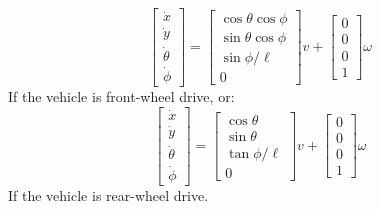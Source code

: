 \begin{equation}
\left[ 
\begin{matrix}
\dot{x} \\ 	\dot{y} \\ 	\dot{\theta} \\	\dot{\phi} 
\end{matrix}
\right] = \left[
\begin{matrix}
\cos\theta\cos\phi \\ \sin\theta\cos\phi \\ \sin\phi/\ell \\ 0 
\end{matrix}
\right] v+ \left[
\begin{matrix}
0 \\0 \\0 \\1
\end{matrix}
\right] \omega
\end{equation}
If the vehicle is front-wheel drive, or:
\begin{equation}
\left[ 
\begin{matrix}
\dot{x} \\ 	\dot{y} \\ 	\dot{\theta} \\	\dot{\phi} 
\end{matrix}
\right] = \left[
\begin{matrix}
\cos\theta \\ \sin\theta \\ \tan\phi/\ell \\ 0 
\end{matrix}
\right] v+ \left[
\begin{matrix}
0 \\0 \\0 \\1
\end{matrix}
\right] \omega
\end{equation}
If the vehicle is rear-wheel drive.

